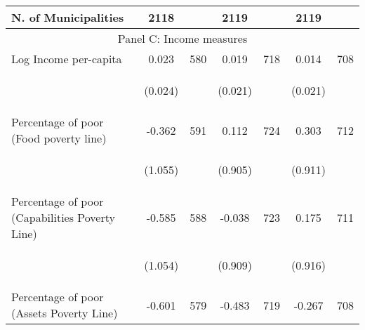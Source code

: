 \begin{tabular}{lcccccc}
N. of Municipalities  &   2118   &  &  2119    & &  2119  &    \\

\hline		

\multicolumn{7}{c}{Panel C: Income measures} \\

Log Income per-capita    &  0.023   &  580  &   0.019  &  718 &  0.014  &  708   \\

\vspace{4pt} &  \begin{footnotesize}(0.024)\end{footnotesize}   & &
			    \begin{footnotesize}(0.021)\end{footnotesize}   & &
			    \begin{footnotesize}(0.021)\end{footnotesize}   &
			     \\          


Percentage of poor (Food poverty line)     &  -0.362   &  591  &   0.112  &  724 &  0.303  &  712   \\

\vspace{4pt} &  \begin{footnotesize}(1.055)\end{footnotesize}   & &
			    \begin{footnotesize}(0.905)\end{footnotesize}   & &
			    \begin{footnotesize}(0.911)\end{footnotesize}   &
			     \\


Percentage of poor (Capabilities Poverty Line)     &  -0.585   &  588  &   -0.038  &  723 &  0.175  &  711   \\

\vspace{4pt} &  \begin{footnotesize}(1.054)\end{footnotesize}   & &
			    \begin{footnotesize}(0.909)\end{footnotesize}   & &
			    \begin{footnotesize}(0.916)\end{footnotesize}   &
			     \\
 
Percentage of poor (Assets Poverty Line)    &  -0.601   &  579  &   -0.483  &  719 &  -0.267  &  708   \\


\end{tabular}
